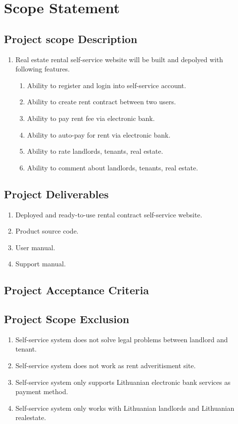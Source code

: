 \documentclass{VUMIFPSkursinis}
\begin{document}
\section{Scope Statement}
	\subsection{Project scope Description}
		\begin{enumerate}
			\item{Real estate rental self-service website will be built and depolyed with following features.}
				\begin{enumerate}
					\item{Ability to register and login into self-service account.}
					\item{Ability to create rent contract between two users.}
					\item{Ability to pay rent fee via electronic bank.}
					\item{Ability to auto-pay for rent via electronic bank.}
					\item{Ability to rate landlords, tenants, real estate.}
					\item{Ability to comment about landlords, tenants, real estate.}
				\end{enumerate}
		\end{enumerate}

	\subsection{Project Deliverables}
		\begin{enumerate}
			\item{Deployed and ready-to-use rental contract self-service website.}
			\item{Product source code.}
			\item{User manual.}
			\item{Support manual.}
		\end{enumerate}

	\subsection{Project Acceptance Criteria}

	\subsection{Project Scope Exclusion}
		\begin{enumerate}
			\item{Self-service system does not solve legal problems between landlord and tenant.}
			\item{Self-service system does not work as rent adveritisment site.}
			\item{Self-service system only supports Lithuanian electronic bank services as payment method.}
			\item{Self-service system only works with Lithuanian landlords and Lithuanian realestate.}
		\end{enumerate}
\end{document}

